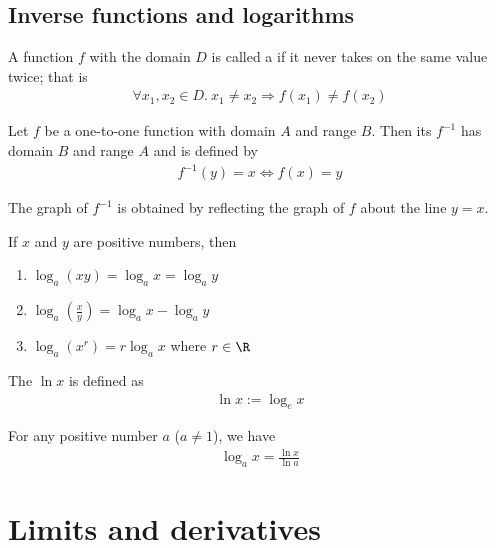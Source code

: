 \documentclass{article}
\begin{document}
\subsection{Inverse functions and logarithms}
\begin{definition}
    A function $f$ with the domain $D$ is called a  if it never takes on the same value twice; that is
    \begin{align*}
        \forall x_1, x_2 \in D.\: x_1\not=x_2 \Rightarrow f(x_1)\not= f(x_2)
    \end{align*}
\end{definition}
\begin{definition}
    Let $f$ be a one-to-one function with domain $A$ and range $B$. Then its  $f^{-1}$ has domain $B$ and range $A$ and is defined by
    \begin{align*}
        f^{-1}(y) = x \Leftrightarrow f(x) = y
    \end{align*}
\end{definition}
\begin{theorem}
    The graph of $f^{-1}$ is obtained by reflecting the graph of $f$ about the line $y=x$.
\end{theorem}
\begin{theorem}
    If $x$ and $y$ are positive numbers, then
    \begin{enumerate}
        \item $\log_a(xy)=\log_ax=\log_ay$
        \item $\log_a(\frac{x}{y}) = \log_ax - \log_ay$
        \item $\log_a(x^r)=r\log_ax$ where $r\in\R$
    \end{enumerate}
\end{theorem}
\begin{definition}
    The  $\ln x$ is defined as
    \begin{align*}
        \ln x := \log_e x
    \end{align*}
\end{definition}
\begin{theorem}
    For any positive number $a$ ($a\not=1$), we have
    \begin{align*}
        \log_a x = \frac{\ln x}{\ln a}
    \end{align*}
\end{theorem}
\section{Limits and derivatives}
\setcounter{subsection}{1}
\end{document}
